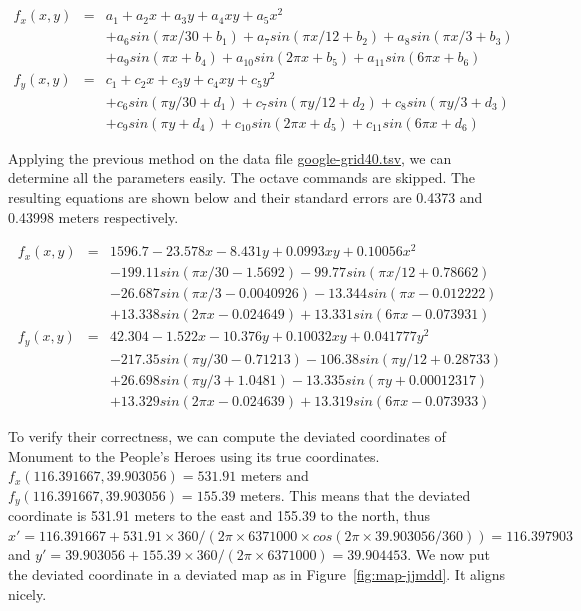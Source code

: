 \documentclass[a4paper]{article}
\begin{document}
\begin{eqnarray}
f_x(x,y) &=& a_1+a_2x+a_3y+a_4xy+a_5x^2 \nonumber \\
         & & +a_6sin(\pi x/30+b_1) +a_7sin(\pi x/12+b_2)+a_8sin(\pi x/3+b_3) \nonumber \\
         & & +a_9sin(\pi x+b_4)+a_{10}sin(2\pi x +b_5) +a_{11}sin(6\pi x+b_6) \\
f_y(x,y) &=& c_1 +c_2x +c_3y +c_4xy +c_5y^2 \nonumber \\
         & & +c_6sin(\pi y/30+d_1)+c_7sin(\pi y/12 +d_2)+c_8sin(\pi y/3+d_3) \nonumber \\
         & & +c_9sin(\pi y+d_4)+c_{10}sin(2\pi x+d_5) +c_{11}sin(6\pi x +d_6)
\end{eqnarray}

Applying the previous method on the data file \url{google-grid40.tsv}, we can
determine all the parameters easily.
The octave commands are skipped.
The resulting equations are shown below and their standard errors are 0.4373
and 0.43998 meters respectively.

\begin{eqnarray}
f_x(x,y) &=& 1596.7-23.578x -8.431y +0.0993xy +0.10056x^2 \nonumber \\
          & & -199.11sin(\pi x/30-1.5692) -99.77sin(\pi x/12+0.78662) \nonumber \\
          & & -26.687sin(\pi x/3-0.0040926) -13.344sin(\pi x-0.012222) \nonumber \\
          & & +13.338sin(2\pi x -0.024649) +13.331sin(6\pi x-0.073931) \\
f_y(x,y) &=& 42.304 -1.522x -10.376y +0.10032xy +0.041777y^2 \nonumber \\
         & & -217.35sin(\pi y/30 -0.71213)-106.38sin(\pi y/12 +0.28733) \nonumber \\
         & & +26.698sin(\pi y/3+1.0481) -13.335sin(\pi y+0.00012317) \nonumber \\
         & & +13.329sin(2\pi x-0.024639) +13.319sin(6\pi x -0.073933)
\end{eqnarray}

To verify their correctness, we can compute the deviated coordinates of Monument
to the People's Heroes using its true coordinates.
$f_x(116.391667,39.903056)=531.91$ meters and
$f_y(116.391667,39.903056)=155.39$ meters.
This means that the deviated coordinate is 531.91 meters to the east and 155.39
to the north, thus $x'=116.391667+531.91\times 360/(2\pi\times 6371000\times
cos(2\pi\times 39.903056/360))=116.397903$ and $y'=39.903056+155.39\times
360/(2\pi\times 6371000)=39.904453$.
We now put the deviated coordinate in a deviated map as in Figure~\ref{fig:map-jjmdd}.
It aligns nicely.
\end{document}
